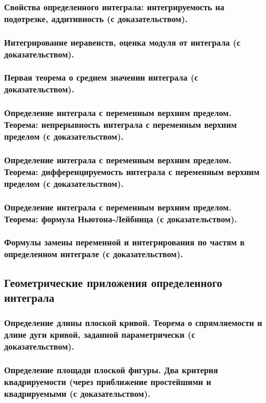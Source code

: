 \documentclass[10pt]{article}
\begin{document}
    \subsubsection{Свойства определенного интеграла: интегрируемость на подотрезке, аддитивность (с доказательством).}
    \subsubsection{Интегрирование неравенств, оценка модуля от интеграла (с доказательством).}
    \subsubsection{Первая теорема о среднем значении интеграла (с доказательством).}
    \subsubsection{Определение интеграла с переменным верхним пределом. Теорема: непрерывность интеграла с переменным верхним пределом (с доказательством).}
    \subsubsection{Определение интеграла с переменным верхним пределом. Теорема: дифференцируемость интеграла с переменным верхним пределом (с доказательством).}
    \subsubsection{Определение интеграла с переменным верхним пределом. Теорема: формула Ньютона-Лейбница (с доказательством).}
    \subsubsection{Формулы замены переменной и интегрирования по частям в определенном интеграле (с доказательством).}
    \subsection{Геометрические приложения определенного интеграла}
    \subsubsection{Определение длины плоской кривой. Теорема о спрямляемости и длине дуги кривой, заданной параметрически (с доказательством).}
    \subsubsection{Определение площади плоской фигуры. Два критерия квадрируемости (через приближение простейшими и квадрируемыми (с доказательством).}
\end{document}
